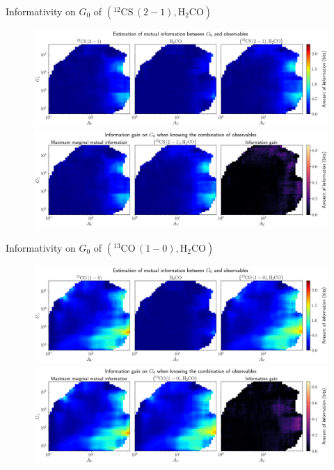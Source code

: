 \documentclass{beamer}
\begin{document}
\begin{frame}{Informativity on $G_0$ of $\left(\mathrm{^{12}CS\,(2-1)},\mathrm{H_2CO}\right)$}
    \begin{figure}
        \centering
        \includegraphics[width=0.95\linewidth]{../mi/g0__12cs21_h2co_mi.png}
        \vfill
        \includegraphics[width=0.95\linewidth]{../mi/g0__12cs21_h2co_mi_gain.png}
    \end{figure}
\end{frame}

\begin{frame}{Informativity on $G_0$ of $\left(\mathrm{^{13}CO\,(1-0)},\mathrm{H_2CO}\right)$}
    \begin{figure}
        \centering
        \includegraphics[width=0.95\linewidth]{../mi/g0__13co10_h2co_mi.png}
        \vfill
        \includegraphics[width=0.95\linewidth]{../mi/g0__13co10_h2co_mi_gain.png}
    \end{figure}
\end{frame}
\end{document}

